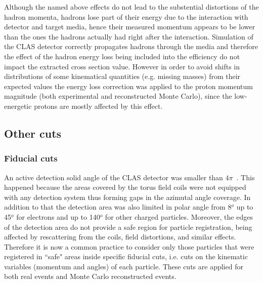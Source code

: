 \documentclass[prc,twocolumn,superscriptaddress,showpacs,amssymb,amsmath,amsfonts,linenumbers,aps]{revtex4-1}
\begin{document}
Although the named above effects do not lead to the substential distortions of the hadron momenta, hadrons lose part of their energy due to the interaction with detector and target media, hence their measured momentum appears to be lower than the ones the hadrons actually had right after the interaction. 
Simulation of the CLAS detector  correctly propagates hadrons through the media and therefore the effect of the hadron energy loss being included into the efficiency do not impact the extracted cross section value.
However in order to avoid shifts in distributions of some kinematical quantities (e.g. missing masses) from their expected values 
the energy loss correction was applied to the proton momentum magnitude (both experimental and reconstructed Monte Carlo),
 since the low-energetic protons are mostly affected by this effect.

\subsection{Other cuts}

\subsubsection{Fiducial cuts}

An active detection solid angle of the CLAS detector
 was smaller than $4\pi$~\cite{Me03}.
This happened because the areas covered by the torus field coils
 were not 
equipped with any detection system thus forming gaps in the azimutal angle coverage. In addition to that the detection area was also limited in polar angle from 8$^{o}$ up to 45$^{o}$ for electrons and up to 140$^{o}$ for other charged particles.
Moreover, the edges of the detection area do not provide a safe region
for particle registration, being affected by rescattering from the
coils, field distortions, and similar effects. Therefore it is now
a common practice to consider only those particles that were registered in ``safe" areas inside specific fiducial cuts, i.e. cuts on the kinematic variables
(momentum and angles) of each particle. These cuts are applied for both real events and Monte Carlo reconstructed events.
\end{document}
